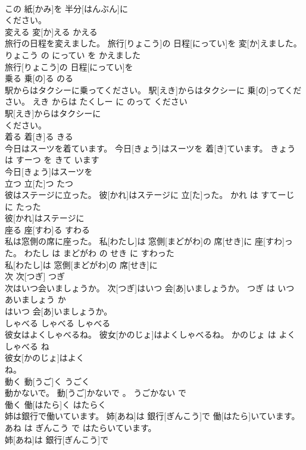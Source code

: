 \documentclass[8pt]{extreport}
\begin{document}
\begin{CJK}{UTF8}{min}
\\	この 紙[かみ]を 半分[はんぶん]に
\\	ください。			
\\	変える	変[か]える	かえる	
\\	旅行の日程を変えました。	旅行[りょこう]の 日程[にってい]を 変[か]えました。	りょこう の にってい を かえました	
\\	旅行[りょこう]の 日程[にってい]を
\\	乗る	乗[の]る	のる	
\\	駅からはタクシーに乗ってください。	駅[えき]からはタクシーに 乗[の]ってください。	えき からは たくしー に のって ください	
\\	駅[えき]からはタクシーに
\\	ください。			
\\	着る	着[き]る	きる	
\\	今日はスーツを着ています。	今日[きょう]はスーツを 着[き]ています。	きょう は すーつ を きて います	
\\	今日[きょう]はスーツを
\\	立つ	立[た]つ	たつ	
\\	彼はステージに立った。	彼[かれ]はステージに 立[た]った。	かれ は すてーじ に たった	
\\	彼[かれ]はステージに
\\	座る	座[すわ]る	すわる	
\\	私は窓側の席に座った。	私[わたし]は 窓側[まどがわ]の 席[せき]に 座[すわ]った。	わたし は まどがわ の せき に すわった	
\\	私[わたし]は 窓側[まどがわ]の 席[せき]に
\\	次	次[つぎ]	つぎ	
\\	次はいつ会いましょうか。	次[つぎ]はいつ 会[あ]いましょうか。	つぎ は いつ あいましょう か	
\\	はいつ 会[あ]いましょうか。			
\\	しゃべる	しゃべる	しゃべる	
\\	彼女はよくしゃべるね。	彼女[かのじょ]はよくしゃべるね。	かのじょ は よく しゃべる ね	
\\	彼女[かのじょ]はよく
\\	ね。			
\\	動く	動[うご]く	うごく	
\\	動かないで。	動[うご]かないで 。	うごかない で	
\\	働く	働[はたら]く	はたらく	
\\	姉は銀行で働いています。	姉[あね]は 銀行[ぎんこう]で 働[はたら]いています。	あね は ぎんこう で はたらいています。	
\\	姉[あね]は 銀行[ぎんこう]で

\end{CJK}
\end{document}
